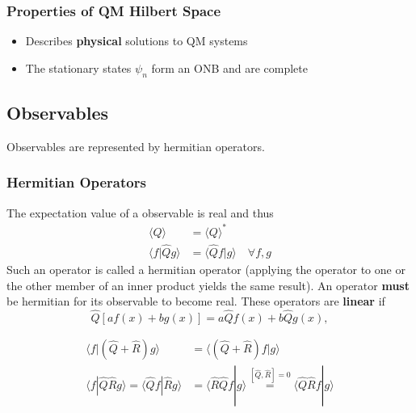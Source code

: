 \subsubsection{Properties of QM Hilbert Space}
\begin{itemize}
    \item Describes \textbf{physical} solutions to QM systems
    \item The stationary states $\psi_n$ form an ONB and are complete
\end{itemize}

\subsection{Observables}
Observables are represented by hermitian operators.
\subsubsection{Hermitian Operators}
The expectation value of a observable is real and thus
\noindent\begin{align*}
    \langle Q\rangle           & = {\langle Q\rangle}^*                       \\
    \langle f|\hat{Q} g\rangle & = \langle \hat{Q}f|g\rangle\quad \forall f,g
\end{align*}
Such an operator is called a hermitian operator (applying the operator to one or the other member of an inner product yields the same result). An operator \textbf{must} be hermitian for its observable to become real. These operators are \textbf{linear} if
\noindent\begin{equation*}
    \hat{Q}\left[af(x)+bg(x)\right]=a\hat{Q}f(x)+b\hat{Q}g(x),
\end{equation*}


\noindent\begin{align*}
    \langle f|(\hat{Q} + \hat{R})g\rangle                                    & = \langle (\hat{Q} + \hat{R})f|g\rangle                                                               \\[0.75em]
    \langle f|\hat{Q}\hat{R}g\rangle       =\langle \hat{Q}f|\hat{R}g\rangle & =  \langle \hat{R}\hat{Q}f|g\rangle \overset{[\hat{Q},\hat{R}]=0}{=} \langle \hat{Q}\hat{R}f|g\rangle
\end{align*}

